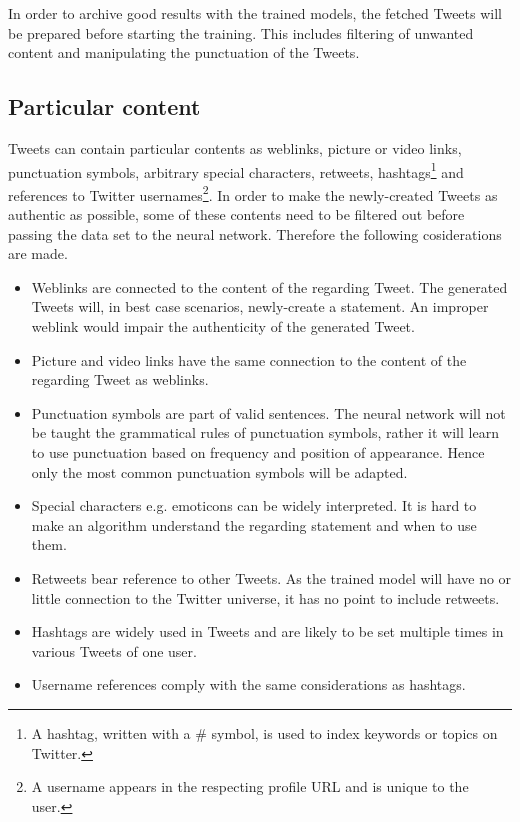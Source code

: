 \documentclass[hidelinks, conference]{IEEEtran}
\begin{document}
In order to archive good results with the trained models, the fetched Tweets will be prepared before starting the training. This includes filtering of unwanted content and manipulating the punctuation of the Tweets. 

\subsection{Particular content}\label{subsec_particular_content}

Tweets can contain particular contents as weblinks, picture or video links, punctuation symbols, arbitrary special characters, retweets, hashtags\footnote{A hashtag, written with a \# symbol, is used to index keywords or topics on Twitter.} and references to Twitter usernames\footnote{A username appears in the respecting profile URL and is unique to the user.}. In order to make the newly-created Tweets as authentic as possible, some of these contents need to be filtered out before passing the data set to the neural network. Therefore the following cosiderations are made.\\

\begin{itemize}
\item Weblinks are connected to the content of the regarding Tweet. The generated Tweets will, in best case scenarios, newly-create a statement. An improper weblink would impair the authenticity of the generated Tweet.
\item Picture and video links have the same connection to the content of the regarding Tweet as weblinks.
\item Punctuation symbols are part of valid sentences. The neural network will not be taught the grammatical rules of punctuation symbols, rather it will learn to use punctuation based on frequency and position of appearance. Hence only the most common punctuation symbols will be adapted.
\item Special characters e.g. emoticons can be widely interpreted. It is hard to make an algorithm understand the regarding statement and when to use them. 
\item Retweets bear reference to other Tweets. As the trained model will have no or little connection to the Twitter universe, it has no point to include retweets.
\item Hashtags are widely used in Tweets and are likely to be set multiple times in various Tweets of one user.
\item Username references comply with the same considerations as hashtags.
\end{itemize}
\end{document}
